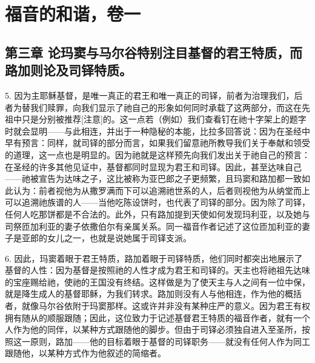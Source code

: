 

\section{福音的和谐，卷一}


\subsection{第三章 论玛窦与马尔谷特别注目基督的君王特质，而路加则论及司铎特质。}

5. 因为主耶稣基督，是唯一真正的君王和唯一真正的司铎，前者为治理我们，后者为替我们赎罪，向我们显示了祂自己的形象如何同时承载了这两部分，而这在先祖中只是分别被推荐[注意]的。这一点若（例如）我们查看钉在祂十字架上的题字时就会显明——与此相连，并出于一种隐秘的本能，比拉多回答说：因为在圣经中早有预言：同样，就司铎的部分而言，如果我们留意祂所教导我们关于奉献和领受的道理，这一点也是明显的。因为祂就是这样预先向我们发出关于祂自己的预言：在圣经的许多其他见证中，基督都同时显现为君王和司铎。因此，甚至达味自己——祂被宣告为达味之子，这比被称为亚巴郎之子更频繁，且玛窦和路加都一致如此认为：前者视他为从撒罗满而下可以追溯祂世系的人，后者则视他为从纳堂而上可以追溯祂族谱的人——当他吃陈设饼时，也代表了司铎的部分。因为除了司铎，任何人吃那饼都是不合法的。此外，只有路加提到天使如何发现玛利亚，以及她与司祭匝加利亚的妻子依撒伯尔有亲属关系。同一福音作者记述了这位匝加利亚的妻子是亚郎的女儿之一，也就是说她属于司铎支派。\par

6. 因此，玛窦着眼于君王特质，路加着眼于司铎特质，他们同时都突出地展示了基督的人性：因为基督是按照祂的人性才成为君王和司铎的。天主也将祂祖先达味的宝座赐给祂，使祂的王国没有终结。这样做是为了使天主与人之间有一位中保，就是降生成人的基督耶稣，为我们转求。路加则没有人与他相连，作为他的概括者，就像马尔谷依附于玛窦那样。这或许并非没有某种庄严的意义。因为君王有权拥有随从的顺服跟随；因此，这位致力于记述基督君王特质的福音作者，就有一个人作为他的同伴，以某种方式跟随他的脚步。但由于司铎必须独自进入至圣所，按照这一原则，路加——他的目标着眼于基督的司铎职务——就没有任何人作为同工跟随他，以某种方式作为他叙述的简缩者。\par

